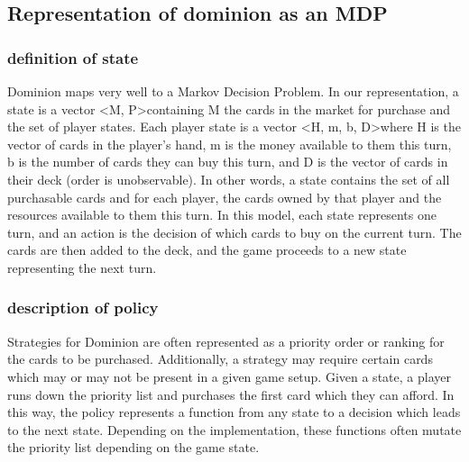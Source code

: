 \documentclass{article}
\begin{document}
\subsection{Representation of dominion as an MDP}
\subsubsection{definition of state}
Dominion maps very well to a Markov Decision Problem. In our representation, a state is a vector \textless M, P\textgreater containing M the cards in the market for purchase and the set of  player states. Each player state is a vector \textless H, m, b, D\textgreater where H is the vector of cards in the player’s hand, m is the money available to them this turn, b is the number of cards they can buy this turn, and D is the vector of cards in their deck (order is unobservable). In other words, a state contains the set of all purchasable cards and for each player, the cards owned by that player and the resources available to them this turn. In this model, each state represents one turn, and an action is the decision of which cards to buy on the current turn. The cards are then added to the deck, and the game proceeds to a new state representing the next turn.
\subsubsection{description of policy}
  Strategies for Dominion are often represented as a priority order or ranking for the cards to be purchased. Additionally, a strategy may require certain cards which may or may not be present in a given game setup. Given a state, a player runs down the priority list and purchases the first card which they can afford. In this way, the policy represents a function from any state to a decision which leads to the next state. Depending on the implementation, these functions often mutate the priority list depending on the game state.
\end{document}
